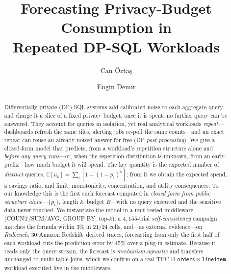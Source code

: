 \documentclass[runningheads]{llncs}
\newcommand{\E}{\mathbb{E}}
\begin{document}
\title{Forecasting Privacy-Budget Consumption in\\ Repeated DP-SQL Workloads}

\author{Can \"Ozta\c{s} \and Engin Demir}

\maketitle

\begin{abstract}
Differentially private (DP) SQL systems add calibrated noise to each aggregate query and charge it a slice of a fixed privacy budget; once it is spent, no further query can be answered. They account for queries in isolation, yet real analytical workloads \emph{repeat}---dashboards refresh the same tiles, alerting jobs re-poll the same counts---and an exact repeat can reuse an already-noised answer for free (DP \emph{post-processing}). We give a closed-form model that predicts, from a workload's repetition structure alone and \emph{before any query runs}---or, when the repetition distribution is unknown, from an early prefix---how much budget it will spend. The key quantity is the expected number of \emph{distinct} queries, $\E[u_k]=\sum_i[1-(1-p_i)^k]$; from it we obtain the expected spend, a savings ratio, and limit, monotonicity, concentration, and utility consequences. To our knowledge this is the first such forecast computed in \emph{closed form from public structure alone}---$\{p_i\}$, length $k$, budget $B$---with no query executed and the sensitive data never touched. We instantiate the model in a unit-tested middleware (COUNT/SUM/AVG, GROUP BY, top-$k$); a $4{,}155$-trial \emph{self-consistency} campaign matches the formula within $3\%$ in $21/24$ cells, and---as external evidence---on \emph{Redbench}, $30$ Amazon Redshift--derived traces, forecasting from only the first half of each workload cuts the prediction error by $45\%$ over a plug-in estimate. Because it reads only the query stream, the forecast is \emph{mechanism-agnostic} and transfers unchanged to multi-table joins, which we confirm on a real TPC-H \texttt{orders}$\bowtie$\texttt{lineitem} workload executed live in the middleware.
\end{abstract}
\end{document}
